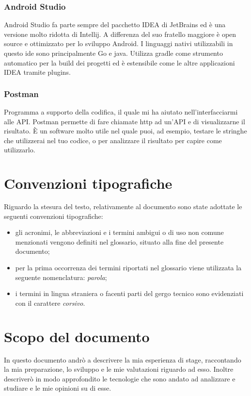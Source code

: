 \subsubsection{Android Studio}
Android Studio fa parte sempre del pacchetto IDEA di JetBrains ed è una versione molto ridotta di Intellij. A differenza del suo
fratello maggiore è open source e ottimizzato per lo sviluppo Android. I linguaggi nativi utilizzabili in questo \acrshort{ide} sono principalmente
\gls{Go} e \gls{java}. Utilizza gradle come strumento automatico per la build dei progetti ed è estensibile come le altre applicazioni IDEA
tramite plugins.

\subsubsection{Postman}
Programma a supporto della codifica, il quale mi ha aiutato nell'interfacciarmi alle API. Postman permette di fare chiamate \acrshort{http} ad
un'API e di visualizzarne il risultato. È un software molto utile nel quale puoi, ad esempio, testare le stringhe che utilizzerai nel tuo
codice, o per analizzare il risultato per capire come utilizzarlo.


\section{Convenzioni tipografiche}

Riguardo la stesura del testo, relativamente al documento sono state adottate le seguenti convenzioni tipografiche:
\begin{itemize}
	\item gli acronimi, le abbreviazioni e i termini ambigui o di uso non comune menzionati vengono definiti nel glossario, situato alla fine del presente documento;
	\item per la prima occorrenza dei termini riportati nel glossario viene utilizzata la seguente nomenclatura: \emph{parola}\glsfirstoccur;
	\item i termini in lingua straniera o facenti parti del gergo tecnico sono evidenziati con il carattere \emph{corsivo}.
\end{itemize}

\section{Scopo del documento}
In questo documento andrò a descrivere la mia esperienza di stage, raccontando la mia preparazione, lo sviluppo e le mie valutazioni
riguardo ad esso. Inoltre descriverò in modo approfondito le tecnologie che sono andato ad analizzare e studiare e le mie opinioni su di esse.


